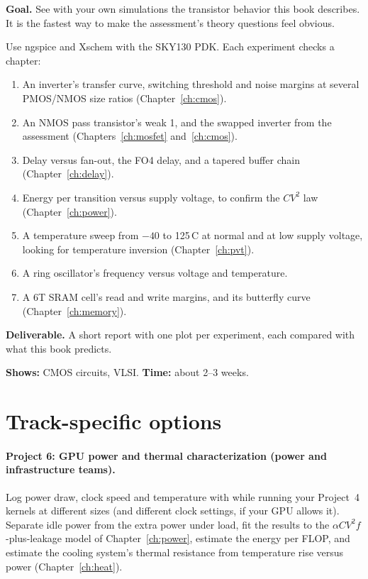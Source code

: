 \textbf{Goal.} See with your own simulations the transistor behavior this book describes. It is the fastest way to make the assessment's theory questions feel obvious.

Use ngspice and Xschem with the SKY130 PDK. Each experiment checks a chapter:
\begin{enumerate}
  \item An inverter's transfer curve, switching threshold and noise margins at several PMOS/NMOS size ratios (Chapter~\ref{ch:cmos}).
  \item An NMOS pass transistor's weak 1, and the swapped inverter from the assessment (Chapters~\ref{ch:mosfet} and~\ref{ch:cmos}).
  \item Delay versus fan-out, the FO4 delay, and a tapered buffer chain (Chapter~\ref{ch:delay}).
  \item Energy per transition versus supply voltage, to confirm the $CV^2$ law (Chapter~\ref{ch:power}).
  \item A temperature sweep from $-40$ to 125\,\textdegree C at normal and at low supply voltage, looking for temperature inversion (Chapter~\ref{ch:pvt}).
  \item A ring oscillator's frequency versus voltage and temperature.
  \item A 6T SRAM cell's read and write margins, and its butterfly curve (Chapter~\ref{ch:memory}).
\end{enumerate}

\textbf{Deliverable.} A short report with one plot per experiment, each compared with what this book predicts.

\textbf{Shows:} CMOS circuits, VLSI. \textbf{Time:} about 2--3 weeks.

\section{Track-specific options}

\paragraph{Project 6: GPU power and thermal characterization (power and infrastructure teams).} Log power draw, clock speed and temperature with  while running your Project~4 kernels at different sizes (and different clock settings, if your GPU allows it). Separate idle power from the extra power under load, fit the results to the $\alpha C V^2 f$-plus-leakage model of Chapter~\ref{ch:power}, estimate the energy per FLOP, and estimate the cooling system's thermal resistance from temperature rise versus power (Chapter~\ref{ch:heat}).

